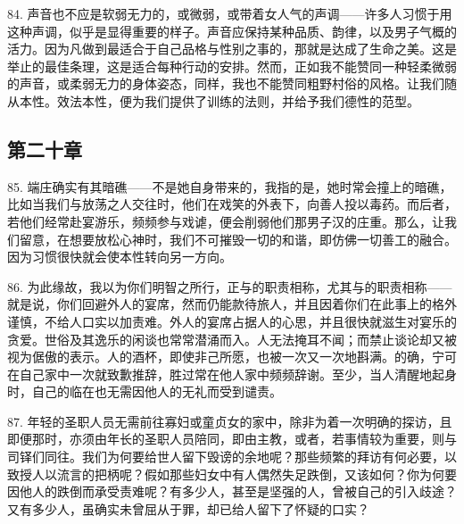 84. 声音也不应是软弱无力的，或微弱，或带着女人气的声调——许多人习惯于用这种声调，似乎是显得重要的样子。声音应保持某种品质、韵律，以及男子气概的活力。因为凡做到最适合于自己品格与性别之事的，那就是达成了生命之美。这是举止的最佳条理，这是适合每种行动的安排。然而，正如我不能赞同一种轻柔微弱的声音，或柔弱无力的身体姿态，同样，我也不能赞同粗野村俗的风格。让我们随从本性。效法本性，便为我们提供了训练的法则，并给予我们德性的范型。\par


\subsection{第二十章}

\par

85. 端庄确实有其暗礁——不是她自身带来的，我指的是，她时常会撞上的暗礁，比如当我们与放荡之人交往时，他们在戏笑的外表下，向善人投以毒药。而后者，若他们经常赴宴游乐，频频参与戏谑，便会削弱他们那男子汉的庄重。那么，让我们留意，在想要放松心神时，我们不可摧毁一切的和谐，即仿佛一切善工的融合。因为习惯很快就会使本性转向另一方向。\par

86. 为此缘故，我以为你们明智之所行，正与的职责相称，尤其与的职责相称——就是说，你们回避外人的宴席，然而仍能款待旅人，并且因着你们在此事上的格外谨慎，不给人口实以加责难。外人的宴席占据人的心思，并且很快就滋生对宴乐的贪爱。世俗及其逸乐的闲谈也常常潜涌而入。人无法掩耳不闻；而禁止谈论却又被视为倨傲的表示。人的酒杯，即使非己所愿，也被一次又一次地斟满。的确，宁可在自己家中一次就致歉推辞，胜过常在他人家中频频辞谢。至少，当人清醒地起身时，自己的临在也无需因他人的无礼而受到谴责。\par

87. 年轻的圣职人员无需前往寡妇或童贞女的家中，除非为着一次明确的探访，且即便那时，亦须由年长的圣职人员陪同，即由主教，或者，若事情较为重要，则与司铎们同往。我们为何要给世人留下毁谤的余地呢？那些频繁的拜访有何必要，以致授人以流言的把柄呢？假如那些妇女中有人偶然失足跌倒，又该如何？你为何要因他人的跌倒而承受责难呢？有多少人，甚至是坚强的人，曾被自己的引入歧途？又有多少人，虽确实未曾屈从于罪，却已给人留下了怀疑的口实？\par

